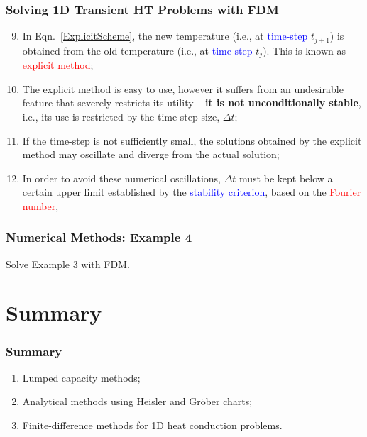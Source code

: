 \documentclass[10pt,compress]{beamer}
\newcommand{\frc}{\displaystyle\frac}
\newcommand{\red}{\textcolor{red}}
\newcommand{\blue}{\textcolor{blue}}
\begin{document}
\begin{frame}
  \frametitle{Solving 1D Transient HT Problems with FDM}
    \begin{enumerate}\setcounter{enumi}{8}
      \item<1-> In Eqn.~\ref{ExplicitScheme}, the new temperature (i.e., at \blue{time-step} $t_{j+1}$) is obtained from the old temperature  (i.e., at \blue{time-step} $t_{j}$). This is known as \red{explicit method}; 
      \item<2-> The explicit method is easy to use, however it suffers from an undesirable feature that severely restricts its utility -- {\bf it is not unconditionally stable}, i.e., its use is restricted by the time-step size, $\Delta t$;
      \item<3-> If the time-step is not sufficiently small, the solutions obtained by the explicit method may oscillate and diverge from the actual solution;
      \item<4-> In order to avoid these numerical oscillations, $\Delta t$ must be kept below a certain upper limit established by the \blue{stability criterion}, based on the \red{Fourier number},
           \visible<4->{\begin{equation}
               Fo = \frc{\alpha \Delta t}{\left(\Delta x\right)^{2}} \leq \frc{1}{2}
           \end{equation}} 

    \end{enumerate}
\end{frame}


\begin{frame}
  \frametitle{Numerical Methods: Example 4}
    Solve Example 3 with FDM.
\end{frame}


\section{Summary} 


\begin{frame}
  \frametitle{Summary}
    \begin{enumerate}  
       \item Lumped capacity methods;  
       \item Analytical methods using Heisler and Gr\"ober charts;
       \item Finite-difference methods for 1D heat conduction problems.
    \end{enumerate}
\end{frame}
\end{document}
